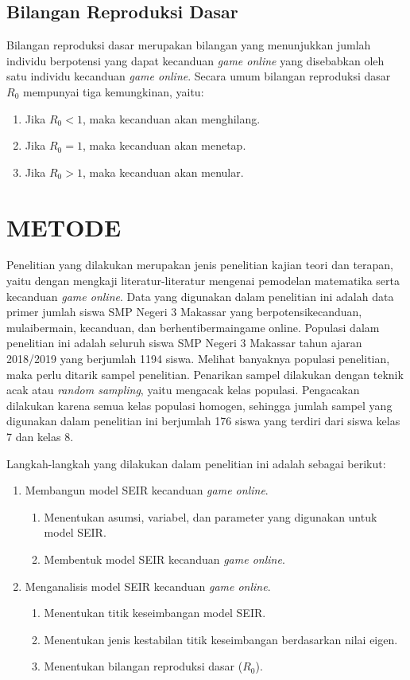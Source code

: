 \documentclass[a4paper, 12pt]{article}
\begin{document}
\subsection{Bilangan Reproduksi Dasar}
Bilangan reproduksi dasar merupakan bilangan yang menunjukkan jumlah individu berpotensi yang dapat kecanduan \textit{game online} yang disebabkan oleh satu individu kecanduan \textit{game online}. Secara umum bilangan reproduksi dasar $R_0$ mempunyai tiga kemungkinan, yaitu:
\begin{enumerate}
    \item Jika $R_0 < 1$, maka kecanduan akan menghilang.
    \item Jika $R_0 = 1$, maka kecanduan akan menetap.
    \item Jika $R_0 > 1$, maka kecanduan akan menular.
\end{enumerate}

\section{METODE}
Penelitian yang dilakukan merupakan jenis penelitian kajian teori dan terapan, yaitu dengan mengkaji literatur-literatur mengenai pemodelan matematika serta kecanduan \textit{game online}. Data yang digunakan dalam penelitian ini adalah data primer jumlah siswa SMP Negeri 3 Makassar yang berpotensikecanduan, mulaibermain, kecanduan, dan berhentibermaingame online. Populasi dalam penelitian ini adalah seluruh siswa SMP Negeri 3 Makassar tahun ajaran 2018/2019 yang berjumlah 1194 siswa. Melihat banyaknya populasi penelitian, maka perlu ditarik sampel penelitian. Penarikan sampel dilakukan dengan teknik acak atau \textit{random sampling}, yaitu mengacak kelas populasi. Pengacakan dilakukan karena semua kelas populasi homogen, sehingga jumlah sampel yang digunakan dalam penelitian ini berjumlah 176 siswa yang terdiri dari siswa kelas 7 dan kelas 8.

Langkah-langkah yang dilakukan dalam penelitian ini adalah sebagai berikut:
\begin{enumerate}
    \item Membangun model SEIR kecanduan \textit{game online}.
    \begin{enumerate}[label=\alph*.]
        \item Menentukan asumsi, variabel, dan parameter yang digunakan untuk model SEIR.
        \item Membentuk model SEIR kecanduan \textit{game online}.
    \end{enumerate}
    \item Menganalisis model SEIR kecanduan \textit{game online}.
    \begin{enumerate}[label=\alph*.]
        \item Menentukan titik keseimbangan model SEIR.
        \item Menentukan jenis kestabilan titik keseimbangan berdasarkan nilai eigen.
        \item Menentukan bilangan reproduksi dasar ($R_0$).
    \end{enumerate}
\end{enumerate}
\end{document}
